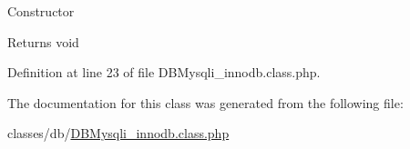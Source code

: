 Constructor \begin{DoxyReturn}{Returns}
void 
\end{DoxyReturn}


Definition at line 23 of file D\+B\+Mysqli\+\_\+innodb.\+class.\+php.



The documentation for this class was generated from the following file\+:\begin{DoxyCompactItemize}
\item 
classes/db/\hyperlink{DBMysqli__innodb_8class_8php}{D\+B\+Mysqli\+\_\+innodb.\+class.\+php}\end{DoxyCompactItemize}
